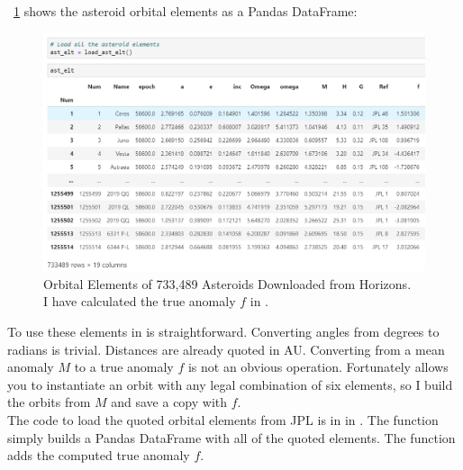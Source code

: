 ~\ref{fig:OrbitalElementsDataFrame} shows the asteroid orbital elements as a Pandas DataFrame:
\begin{figure}[hbt!]
\begin{center}
\includegraphics[width=1.0\textwidth]{../figs/elts/ast_elt_dataframe.png}
\end{center}
\caption[Orbital Elements of 733,489 Asteroids Downloaded from Horizons]
{Orbital Elements of 733,489 Asteroids Downloaded from Horizons.\\
I have calculated the true anomaly $f$ in .}
\label{fig:OrbitalElementsDataFrame}
\end{figure}
To use these elements in  is straightforward.
Converting angles from degrees to radians is trivial.
Distances are already quoted in AU.
Converting from a mean anomaly $M$ to a true anomaly $f$ is not an obvious operation.
Fortunately  allows you to instantiate an orbit with any legal combination of six elements,
so I build the orbits from $M$ and save a copy with $f$. \\
The code to load the quoted orbital elements from JPL is in  in .
The function  simply builds a Pandas DataFrame with all of the quoted elements.
The function  adds the computed true anomaly $f$.

